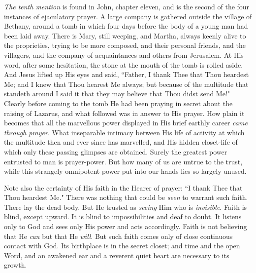 \textit{The tenth mention} is found in John, chapter eleven, and is the second of
the four instances of ejaculatory prayer. A large company is gathered
outside the village of Bethany, around a tomb in which four days before
the body of a young man had been laid away. There is Mary, still weeping,
and Martha, always keenly alive to the proprieties, trying to be more
composed, and their personal friends, and the villagers, and the company
of acquaintances and others from Jerusalem. At His word, after some
hesitation, the stone at the mouth of the tomb is rolled aside. And Jesus
lifted up His eyes and said, ``Father, I thank Thee that Thou heardest Me;
and I knew that Thou hearest Me always; but because of the multitude that
standeth around I said it that they may believe that Thou didst send Me!"
Clearly before coming to the tomb He had been praying in secret about the
raising of Lazarus, and what followed was in answer to His prayer. How
plain it becomes that all the marvellous power displayed in His brief
earthly career \textit{came through prayer}. What inseparable intimacy between
His life of activity at which the multitude then and ever since has
marvelled, and His hidden closet-life of which only these passing glimpses
are obtained. Surely the greatest power entrusted to man is prayer-power.
But how many of us are untrue to the trust, while this strangely
omnipotent power put into our hands lies so largely unused.

Note also the certainty of His faith in the Hearer of prayer: ``I thank
Thee that Thou heardest Me." There was nothing that could be \textit{seen} to
warrant such faith. There lay the dead body. But He trusted as \textit{seeing}
Him who is \textit{invisible}. Faith is blind, except upward. It is blind to
impossibilities and deaf to doubt. It listens only to God and sees only
His power and acts accordingly. Faith is not believing that He \textit{can} but
that He \textit{will}. But such faith comes only of close continuous contact with
God. Its birthplace is in the secret closet; and time and the open Word,
and an awakened ear and a reverent quiet heart are necessary to its
growth.

